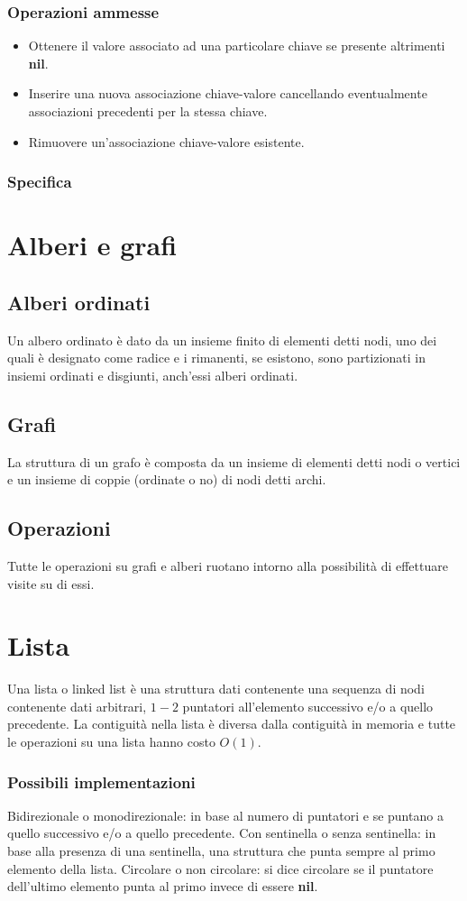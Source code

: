 \subsubsection{Operazioni ammesse}
\begin{itemize}
\item Ottenere il valore associato ad una particolare chiave se presente altrimenti \textbf{nil}.
\item Inserire una nuova associazione chiave-valore cancellando eventualmente associazioni precedenti per la stessa chiave.
\item Rimuovere un'associazione chiave-valore esistente.
\end{itemize}
\subsubsection{Specifica}

\section{Alberi e grafi}
\subsection{Alberi ordinati}
Un albero ordinato \`e dato da un insieme finito di elementi detti nodi, uno dei quali \`e designato come radice e i rimanenti, se esistono, sono 
partizionati in insiemi ordinati e disgiunti, anch'essi alberi ordinati.
\subsection{Grafi}
La struttura di un grafo \`e composta da un insieme di elementi detti nodi o vertici e un insieme di coppie (ordinate o no) di nodi detti archi.
\subsection{Operazioni}
Tutte le operazioni su grafi e alberi ruotano intorno alla possibilit\`a di effettuare visite su di essi.
\section{Lista}
Una lista o linked list \`e una struttura dati contenente una sequenza di nodi contenente dati arbitrari, $1-2$ puntatori all'elemento successivo e/o a 
quello precedente. La contiguit\`a nella lista \`e diversa dalla contiguit\`a in memoria e tutte le operazioni su una lista hanno costo $O(1)$.
\subsubsection{Possibili implementazioni}
Bidirezionale o monodirezionale: in base al numero di puntatori e se puntano a quello successivo e/o a quello precedente.
Con sentinella o senza sentinella: in base alla presenza di una sentinella, una struttura che punta sempre al primo elemento della lista.
Circolare o non circolare: si dice circolare se il puntatore dell'ultimo elemento punta al primo invece di essere \textbf{nil}.
